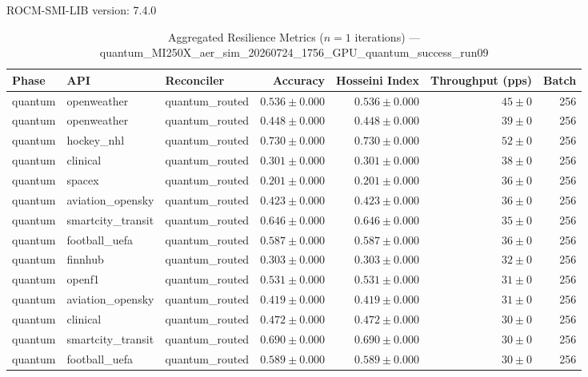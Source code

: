 ROCM-SMI-LIB version: 7.4.0

\begin{table}[htbp]
\caption{Aggregated Resilience Metrics ($n=1$ iterations) --- quantum_MI250X_aer_sim_20260724_1756_GPU_quantum_success_run09}
\begin{tabular}{l l l r r r r}
\hline
Phase & API & Reconciler & Accuracy & Hosseini Index & Throughput (pps) & Batch \\
\hline
quantum & openweather & quantum\_routed & $0.536\pm0.000$ & $0.536\pm0.000$ & $45\pm0$ & 256 \\
quantum & openweather & quantum\_routed & $0.448\pm0.000$ & $0.448\pm0.000$ & $39\pm0$ & 256 \\
quantum & hockey\_nhl & quantum\_routed & $0.730\pm0.000$ & $0.730\pm0.000$ & $52\pm0$ & 256 \\
quantum & clinical & quantum\_routed & $0.301\pm0.000$ & $0.301\pm0.000$ & $38\pm0$ & 256 \\
quantum & spacex & quantum\_routed & $0.201\pm0.000$ & $0.201\pm0.000$ & $36\pm0$ & 256 \\
quantum & aviation\_opensky & quantum\_routed & $0.423\pm0.000$ & $0.423\pm0.000$ & $36\pm0$ & 256 \\
quantum & smartcity\_transit & quantum\_routed & $0.646\pm0.000$ & $0.646\pm0.000$ & $35\pm0$ & 256 \\
quantum & football\_uefa & quantum\_routed & $0.587\pm0.000$ & $0.587\pm0.000$ & $36\pm0$ & 256 \\
quantum & finnhub & quantum\_routed & $0.303\pm0.000$ & $0.303\pm0.000$ & $32\pm0$ & 256 \\
quantum & openf1 & quantum\_routed & $0.531\pm0.000$ & $0.531\pm0.000$ & $31\pm0$ & 256 \\
quantum & aviation\_opensky & quantum\_routed & $0.419\pm0.000$ & $0.419\pm0.000$ & $31\pm0$ & 256 \\
quantum & clinical & quantum\_routed & $0.472\pm0.000$ & $0.472\pm0.000$ & $30\pm0$ & 256 \\
quantum & smartcity\_transit & quantum\_routed & $0.690\pm0.000$ & $0.690\pm0.000$ & $30\pm0$ & 256 \\
quantum & football\_uefa & quantum\_routed & $0.589\pm0.000$ & $0.589\pm0.000$ & $30\pm0$ & 256 \\

\end{tabular}
\end{table}
